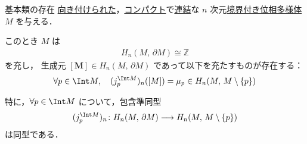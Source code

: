 \documentclass[algtopo_main]{subfiles}
\begin{document}
\begin{mytheo}[label=thm:fundamental-class]{基本類の存在}
    \hyperref[def:orientable]{向き付けられた}，\underline{コンパクト}で\underline{連結}な $n$ 次元\hyperref[def:mani-with-boundary]{境界付き位相多様体} $M$ を与える．

    このとき $M$ は
    \begin{align}
        H_n(M,\, \partial M) \cong \mathbb{Z}
    \end{align}
    を充し，
    生成元 $\bm{[M]} \in H_n(M,\, \partial M)$ であって以下を充たすものが存在する：
    \begin{align}
        \forall p \in \Int M,\quad (j_p^{\Int M})_n ([M]) = \mu_p \in H_n (M,\, M \setminus \{p\})
    \end{align}

    特に，$\forall p \in \Int M$ について，包含準同型
    \begin{align}
        (j_p^{\Int M})_n \colon H_n (M,\, \partial M) \lto H_n (M,\, M \setminus\{p\})
    \end{align}
    は同型である．
\end{mytheo}
\end{document}
